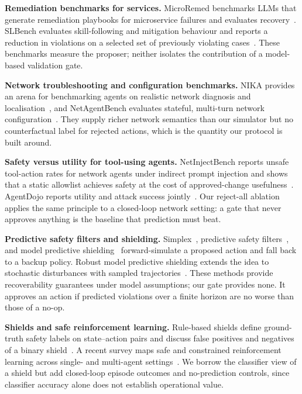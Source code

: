 \documentclass[conference]{IEEEtran}
\begin{document}
\textbf{Remediation benchmarks for services.} MicroRemed benchmarks LLMs that generate remediation playbooks for microservice failures and evaluates recovery~\cite{microremed}. SLBench evaluates skill-following and mitigation behaviour and reports a reduction in violations on a selected set of previously violating cases~\cite{slbench}. These benchmarks measure the proposer; neither isolates the contribution of a model-based validation gate.

\textbf{Network troubleshooting and configuration benchmarks.} NIKA provides an arena for benchmarking agents on realistic network diagnosis and localisation~\cite{nika}, and NetAgentBench evaluates stateful, multi-turn network configuration~\cite{netagentbench}. They supply richer network semantics than our simulator but no counterfactual label for rejected actions, which is the quantity our protocol is built around.

\textbf{Safety versus utility for tool-using agents.} NetInjectBench reports unsafe tool-action rates for network agents under indirect prompt injection and shows that a static allowlist achieves safety at the cost of approved-change usefulness~\cite{netinjectbench}. AgentDojo reports utility and attack success jointly~\cite{agentdojo}. Our reject-all ablation applies the same principle to a closed-loop network setting: a gate that never approves anything is the baseline that prediction must beat.

\textbf{Predictive safety filters and shielding.} Simplex~\cite{simplex}, predictive safety filters~\cite{wabersich}, and model predictive shielding~\cite{mps} forward-simulate a proposed action and fall back to a backup policy. Robust model predictive shielding extends the idea to stochastic disturbances with sampled trajectories~\cite{robustmps}. These methods provide recoverability guarantees under model assumptions; our gate provides none. It approves an action if predicted violations over a finite horizon are no worse than those of a no-op.

\textbf{Shields and safe reinforcement learning.} Rule-based shields define ground-truth safety labels on state--action pairs and discuss false positives and negatives of a binary shield~\cite{rulebasedshield}. A recent survey maps safe and constrained reinforcement learning across single- and multi-agent settings~\cite{saferlsurvey}. We borrow the classifier view of a shield but add closed-loop episode outcomes and no-prediction controls, since classifier accuracy alone does not establish operational value.
\end{document}
